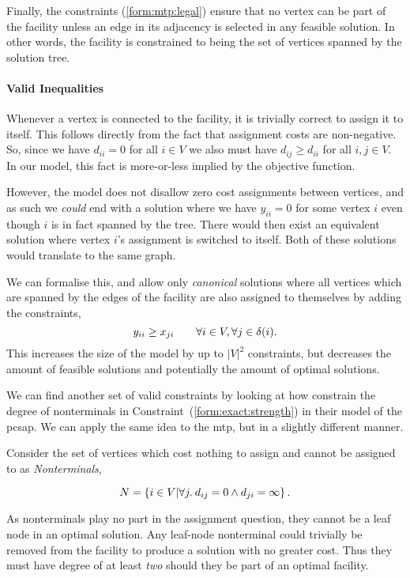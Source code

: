  Finally, the constraints (\ref{form:mtp:legal}) ensure that no vertex can be part
 of the facility unless an edge in its adjacency is selected in any feasible solution.
 In other words, the facility is constrained to being
 the set of vertices spanned by the solution tree.

 \paragraph{Valid Inequalities}
 Whenever a vertex is connected to the facility, it is trivially correct to assign it to itself.
 This follows directly from the fact that assignment costs are non-negative.
 So, since we have $d_{ii} = 0$
 for all $i \in V$
 we also must have $d_{ij} \geq d_{ii}$
 for all $i,j \in V$.
 In our model, this fact is more-or-less implied by the objective function.
 
 However, the model does not disallow zero cost assignments between
 vertices, and as such we \textit{could} end with a solution where we have $y_{ii} = 0$ for some
 vertex $i$ even though $i$ is in fact spanned by the tree. There would then exist an equivalent
 solution where vertex $i$'s assignment is switched to itself. Both of these solutions would translate
 to the same graph.

 We can formalise this, and allow only \textit{canonical} solutions where all vertices
 which are spanned by the edges of the facility are also assigned to themselves by
 adding the constraints,
 \begin{equation}\label{form:mtp:str}
 y_{ii} \geq x_{ji} \qquad \forall i \in V,  \forall j \in \delta(i)\mathnormal{.}
\end{equation}
This increases the size of the model by up to $|V|^2$ constraints, but
decreases the amount of feasible solutions and potentially the amount of optimal solutions.
\medskip

We can find another set of valid constraints by looking at how \citet{ljubic2005solving}
constrain the degree of nonterminals in
Constraint~(\ref{form:exact:strength}) in their model of the \gls{pcsap}.
We can apply the same idea to the \gls{mtp}, but in a slightly different manner.

 Consider the set of vertices which cost nothing to assign and cannot be assigned to as \textit{Nonterminals},

 \[N = \left\{ i \in V \middle\vert \forall j.\: d_{ij} = 0 \wedge   d_{ji} = \infty\right\}\mathnormal{.}\]

 As nonterminals play no part in the assignment question,
 they cannot be a leaf node in an optimal solution.
 Any leaf-node nonterminal could trivially
 be removed from the facility to produce a solution with no greater cost.
 Thus they must have degree of at least
 \textit{two} should they be part of an optimal facility.

